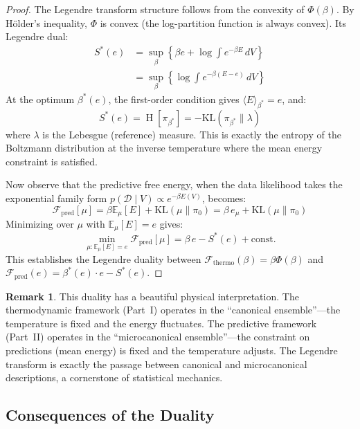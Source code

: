 \documentclass[12pt,a4paper]{article}
\theoremstyle{definition}
\newtheorem{remark}[theorem]{Remark}
\newcommand{\E}{\mathbb{E}}
\newcommand{\KL}{\mathrm{KL}}
\DeclareMathOperator{\Ent}{H}
\begin{document}
\begin{proof}
The Legendre transform structure follows from the convexity of $\Phi(\beta)$. By H\"{o}lder's inequality, $\Phi$ is convex (the log-partition function is always convex). Its Legendre dual:
\begin{align}
    S^*(e) &= \sup_\beta \left\{\beta e + \log \int e^{-\beta E} \, dV\right\} \\
    &= \sup_\beta \left\{\log \int e^{-\beta(E - e)} \, dV\right\}
\end{align}
At the optimum $\beta^*(e)$, the first-order condition gives $\langle E \rangle_{\beta^*} = e$, and:
\begin{equation}
    S^*(e) = \Ent[\pi_{\beta^*}] = -\KL(\pi_{\beta^*} \| \lambda)
\end{equation}
where $\lambda$ is the Lebesgue (reference) measure. This is exactly the entropy of the Boltzmann distribution at the inverse temperature where the mean energy constraint is satisfied.

Now observe that the predictive free energy, when the data likelihood takes the exponential family form $p(\mathcal{D} \mid V) \propto e^{-\beta E(V)}$, becomes:
\begin{equation}
    \mathcal{F}_{\text{pred}}[\mu] = \beta \E_\mu[E] + \KL(\mu \| \pi_0) = \beta \, e_\mu + \KL(\mu \| \pi_0)
\end{equation}
Minimizing over $\mu$ with $\E_\mu[E] = e$ gives:
\begin{equation}
    \min_{\mu: \E_\mu[E]=e} \mathcal{F}_{\text{pred}}[\mu] = \beta \, e - S^*(e) + \text{const.}
\end{equation}
This establishes the Legendre duality between $\mathcal{F}_{\text{thermo}}(\beta) = \beta \Phi(\beta)$ and $\mathcal{F}_{\text{pred}}(e) = \beta^*(e) \cdot e - S^*(e)$.
\end{proof}

\begin{remark}
This duality has a beautiful physical interpretation. The thermodynamic framework (Part~I) operates in the ``canonical ensemble''---the temperature is fixed and the energy fluctuates. The predictive framework (Part~II) operates in the ``microcanonical ensemble''---the constraint on predictions (mean energy) is fixed and the temperature adjusts. The Legendre transform is exactly the passage between canonical and microcanonical descriptions, a cornerstone of statistical mechanics.
\end{remark}

\subsection{Consequences of the Duality}
\end{document}

